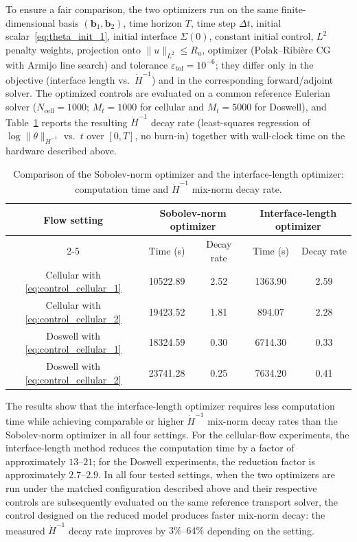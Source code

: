 \documentclass[12pt, reqno]{amsart}
\theoremstyle{plain}
\theoremstyle{definition}
\numberwithin{equation}{section}
\numberwithin{figure}{section}
\numberwithin{algorithm}{section}
\begin{document}
To ensure a fair comparison, the two optimizers run on the same finite-dimensional basis $(\mathbf b_1,\mathbf b_2)$, time horizon $T$, time step $\Delta t$, initial scalar~\eqref{eq:theta_init_1}, initial interface $\Sigma(0)$, constant initial control, $L^2$ penalty weights, projection onto $\|u\|_{L^2}\le R_u$, optimizer (Polak--Ribi\`ere CG with Armijo line search) and tolerance $\varepsilon_{\mathrm{tol}}=10^{-6}$; they differ only in the objective (interface length vs.\ $\dot{H}^{-1}$) and in the corresponding forward/adjoint solver. The optimized controls are evaluated on a common reference Eulerian solver ($N_{\mathrm{cell}}=1000$; $M_t=1000$ for cellular and $M_t=5000$ for Doswell), and Table~\ref{tab:optimizer_comparison} reports the resulting $\dot{H}^{-1}$ decay rate (least-squares regression of $\log\|\theta\|_{\dot{H}^{-1}}$ vs.\ $t$ over $[0,T]$, no burn-in) together with wall-clock time on the hardware described above.

\begin{table}[ht]
\centering
\begin{tabular}{|c|c|c|c|c|}
\hline
\multirow{2}{*}{Flow setting}
& \multicolumn{2}{c|}{Sobolev-norm optimizer}
& \multicolumn{2}{c|}{Interface-length optimizer} \\
\cline{2-5}
& Time (s) & Decay rate & Time (s) & Decay rate \\ \hline
Cellular with \eqref{eq:control_cellular_1} & 10522.89 & 2.52 & 1363.90 & 2.59 \\ \hline
Cellular with \eqref{eq:control_cellular_2} & 19423.52 & 1.81 & 894.07 & 2.28 \\ \hline
Doswell with \eqref{eq:control_cellular_1} & 18324.59 & 0.30 & 6714.30 & 0.33 \\ \hline
Doswell with \eqref{eq:control_cellular_2} & 23741.28 & 0.25 & 7634.20 & 0.41 \\ \hline
\end{tabular}
\caption{Comparison of the Sobolev-norm optimizer \cite{hu2026structure} and the interface-length optimizer: computation time and $\dot{H}^{-1}$ mix-norm decay rate.}
\label{tab:optimizer_comparison}
\end{table}

The results show that the interface-length optimizer requires less computation time while achieving comparable or higher $\dot{H}^{-1}$ mix-norm decay rates than the Sobolev-norm optimizer in all four settings. For the cellular-flow experiments, the interface-length method reduces the computation time by a factor of approximately $13$--$21$; for the Doswell experiments, the reduction factor is approximately $2.7$--$2.9$. In all four tested settings, when the two optimizers are run under the matched configuration described above and their respective controls are subsequently evaluated on the same reference transport solver, the control designed on the reduced model produces faster mix-norm decay: the measured $\dot{H}^{-1}$ decay rate improves by $3\%$--$64\%$ depending on the setting.
\end{document}
